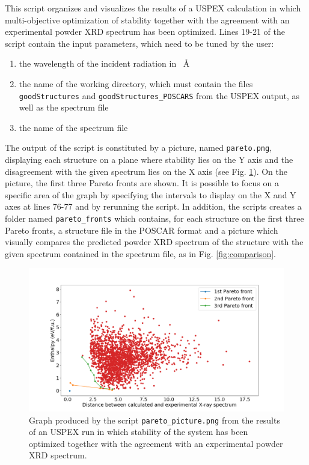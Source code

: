 \documentclass{article}
\begin{document}
This script organizes and visualizes the results of a USPEX calculation in which multi-objective optimization of stability together with the agreement with an experimental powder XRD spectrum has been optimized. Lines 19-21 of the script contain the input parameters, which need to be tuned by the user:
\begin{enumerate}
	\item  the wavelength of the incident radiation in \SI{}{\angstrom}
	\item the name of the working directory, which must contain the files \texttt{goodStr\-uctures} and \texttt{goodStructures\_POSCARS} from the USPEX output, as well as the spectrum file
	\item the name of the spectrum file
\end{enumerate}
The output of the script is constituted by a picture, named \texttt{pareto.png}, displaying each structure on a plane where stability lies on the Y axis and the disagreement with the given spectrum lies on the X axis (see Fig. \ref{fig:pfronts}). On the picture, the first three Pareto fronts are shown. It is possible to focus on a specific area of the graph by specifying the intervals to display on the X and Y axes at lines 76-77 and by rerunning the script. In addition, the scripts creates a folder named \texttt{pareto\_fronts} which contains, for each structure on the first three Pareto fronts, a structure file in the POSCAR format and a picture which visually compares the predicted powder XRD spectrum of the structure with the given spectrum contained in the spectrum file, as in Fig. \ref{fig:comparison}.
\begin{figure}
	\centering
	\includegraphics[width=\textwidth]{pareto.png}
	\caption{Graph produced by the script \texttt{pareto\_picture.png} from the results of an USPEX run in which stability of the system  has been optimized together with the agreement with an experimental powder XRD spectrum.}
	\label{fig:pfronts}
\end{figure}
\end{document}
